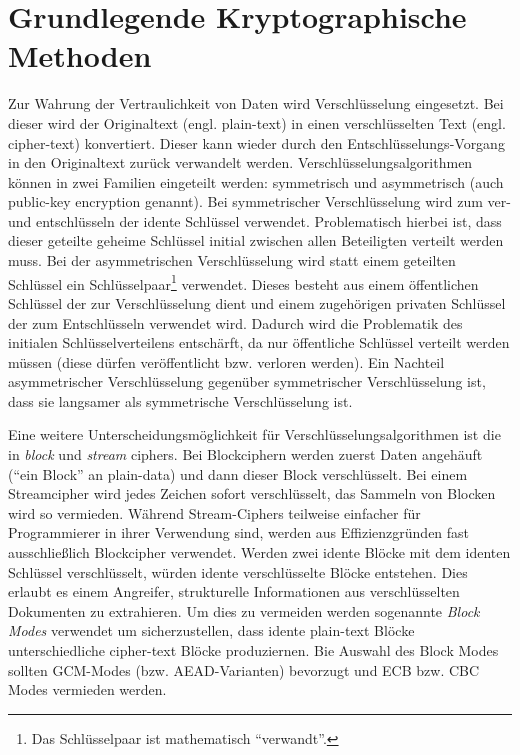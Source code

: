 \section{Grundlegende Kryptographische Methoden}

Zur Wahrung der Vertraulichkeit von Daten wird Verschlüsselung eingesetzt. Bei dieser wird der Originaltext (engl. plain-text) in einen verschlüsselten Text (engl. cipher-text) konvertiert. Dieser kann wieder durch den Entschlüsselungs-Vorgang in den Originaltext zurück verwandelt werden. Verschlüsselungsalgorithmen können in zwei Familien eingeteilt werden: symmetrisch und asymmetrisch (auch public-key encryption genannt). Bei symmetrischer Verschlüsselung wird zum ver- und entschlüsseln der idente Schlüssel verwendet. Problematisch hierbei ist, dass dieser geteilte geheime Schlüssel initial zwischen allen Beteiligten verteilt werden muss. Bei der asymmetrischen Verschlüsselung wird statt einem geteilten Schlüssel ein Schlüsselpaar\footnote{Das Schlüsselpaar ist mathematisch ``verwandt''.} verwendet. Dieses besteht aus einem öffentlichen Schlüssel der zur Verschlüsselung dient und einem zugehörigen privaten Schlüssel der zum Entschlüsseln verwendet wird. Dadurch wird die Problematik des initialen Schlüsselverteilens entschärft, da nur öffentliche Schlüssel verteilt werden müssen (diese dürfen veröffentlicht bzw. verloren werden). Ein Nachteil asymmetrischer Verschlüsselung gegenüber symmetrischer Verschlüsselung ist, dass sie langsamer als symmetrische Verschlüsselung ist.

Eine weitere Unterscheidungsmöglichkeit für Verschlüsselungsalgorithmen ist die in \textit{block} und \textit{stream} ciphers. Bei Blockciphern werden zuerst Daten angehäuft (``ein Block'' an plain-data) und dann dieser Block verschlüsselt. Bei einem Streamcipher wird jedes Zeichen sofort verschlüsselt, das Sammeln von Blocken wird so vermieden. Während Stream-Ciphers teilweise einfacher für Programmierer in ihrer Verwendung sind, werden aus Effizienzgründen fast ausschließlich Blockcipher verwendet. Werden zwei idente Blöcke mit dem identen Schlüssel verschlüsselt, würden idente verschlüsselte Blöcke entstehen. Dies erlaubt es einem Angreifer, strukturelle Informationen aus verschlüsselten Dokumenten zu extrahieren. Um dies zu vermeiden werden sogenannte \textit{Block Modes} verwendet um sicherzustellen, dass idente plain-text Blöcke unterschiedliche cipher-text Blöcke produziernen. Bie Auswahl des Block Modes sollten GCM-Modes (bzw. AEAD-Varianten) bevorzugt und ECB bzw. CBC Modes vermieden werden.

